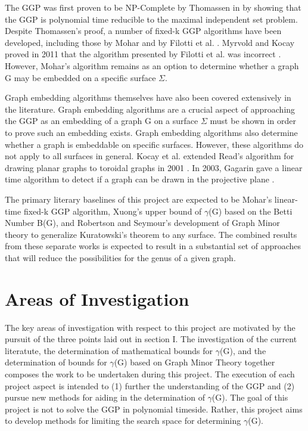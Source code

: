 \documentclass[12pt,conference]{IEEEtran}
\begin{document}
The GGP was first proven to be NP-Complete by Thomassen in \cite{thomassen} by showing that the GGP is polynomial time reducible to the maximal independent set problem. Despite Thomassen's proof, a number of fixed-k GGP algorithms have been developed, including those by Mohar \cite{mohar} and by Filotti et al. \cite{filotti}. Myrvold and Kocay proved in 2011 that the algorithm presented by Filotti et al. was incorrect \cite{myrvold-kocay}. However, Mohar's algorithm remains as an option to determine whether a graph G may be embedded on a specific surface $\Sigma$.

Graph embedding algorithms themselves have also been covered extensively in the literature. Graph embedding algorithms are a crucial aspect of approaching the GGP as an embedding of a graph G on a surface $\Sigma$ must be shown in order to prove such an embedding exists. Graph embedding algorithms also determine whether a graph is embeddable on specific surfaces. However, these algorithms do not apply to all surfaces in general. Kocay et al. extended Read's algorithm for drawing planar graphs to toroidal graphs in 2001 \cite{kocay}. In 2003, Gagarin gave a linear time algorithm to detect if a graph can be drawn in the projective plane \cite{gagarin}. 

The primary literary baselines of this project are expected to be Mohar's linear-time fixed-k GGP algorithm, Xuong's upper bound of $\gamma$(G) based on the Betti Number B(G), and Robertson and Seymour's development of Graph Minor theory to generalize Kuratowski's theorem to any surface. The combined results from these separate works is expected to result in a substantial set of approaches that will reduce the possibilities for the genus of a given graph.

\section{Areas of Investigation}

The key areas of investigation with respect to this project are motivated by the pursuit of the three points laid out in section I. The investigation of the current literatute, the determination of mathematical bounds for $\gamma$(G), and the determination of bounds for $\gamma$(G) based on Graph Minor Theory together composes the work to be undertaken during this project. The execution of each project aspect is intended to (1) further the understanding of the GGP and (2) pursue new methods for aiding in the determination of $\gamma$(G). The goal of this project is not to solve the GGP in polynomial timeside. Rather, this project aims to develop methods for limiting the search space for determining $\gamma$(G).
\end{document}
